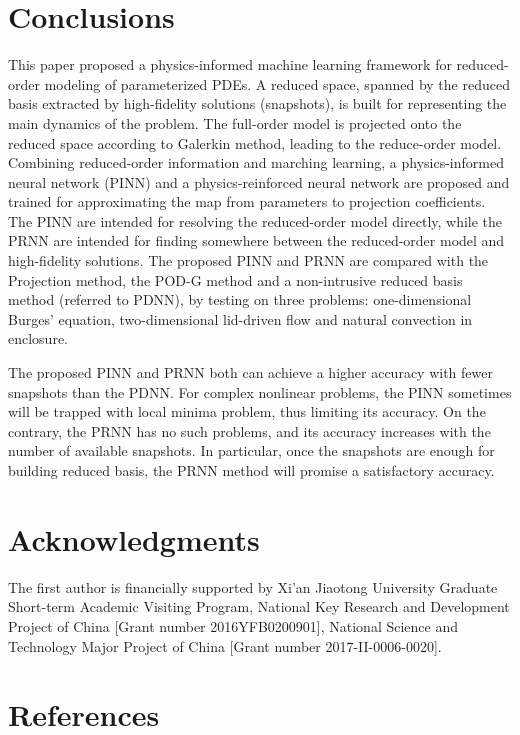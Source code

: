 \documentclass[preprint, 10pt]{elsarticle}
\begin{document}
\FloatBarrier
\section{Conclusions}
This paper proposed a physics-informed machine learning framework for reduced-order modeling of parameterized PDEs.
A reduced space, spanned by the reduced basis extracted by high-fidelity solutions (snapshots), is built for representing the main dynamics of the problem. The full-order model is projected onto the reduced space according to Galerkin method, leading to the reduce-order model.
Combining reduced-order information and marching learning, a physics-informed neural network (PINN) and a physics-reinforced neural network are proposed and trained for approximating the map from parameters to projection coefficients.
The PINN are intended for resolving the reduced-order model directly, while the PRNN are intended for finding somewhere between the reduced-order model and high-fidelity solutions.  The proposed PINN and PRNN  are compared with the Projection method, the POD-G method and  a non-intrusive reduced basis method (referred to PDNN), by testing on three problems: one-dimensional Burges' equation, two-dimensional lid-driven flow and natural convection in enclosure.

The proposed PINN and PRNN both can achieve a higher accuracy with fewer snapshots than the PDNN. For complex nonlinear problems, the PINN sometimes will be trapped with local minima problem, thus limiting its accuracy. On the contrary, the PRNN has no such problems, and its accuracy increases with the number of available snapshots. In particular, once the snapshots are enough for building reduced basis, the PRNN method will promise a satisfactory accuracy.


\section*{Acknowledgments}
The first author is financially supported by Xi'an Jiaotong University Graduate Short-term Academic Visiting Program, National Key Research and Development Project of China [Grant number 2016YFB0200901], National Science and Technology Major Project of China [Grant number 2017-II-0006-0020].

\section*{References}


\end{document}

